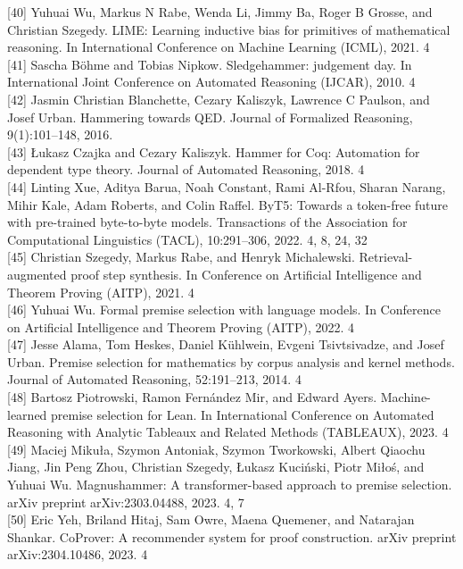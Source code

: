 \documentclass[
]{article}
\begin{document}
{[}40{]} Yuhuai Wu, Markus N Rabe, Wenda Li, Jimmy Ba, Roger B Grosse,
and Christian Szegedy. LIME: Learning inductive bias for primitives of
mathematical reasoning. In International Conference on Machine Learning
(ICML), 2021. 4\\
{[}41{]} Sascha Böhme and Tobias Nipkow. Sledgehammer: judgement day. In
International Joint Conference on Automated Reasoning (IJCAR), 2010. 4\\
{[}42{]} Jasmin Christian Blanchette, Cezary Kaliszyk, Lawrence C
Paulson, and Josef Urban. Hammering towards QED. Journal of Formalized
Reasoning, 9(1):101--148, 2016.\\
{[}43{]} Łukasz Czajka and Cezary Kaliszyk. Hammer for Coq: Automation
for dependent type theory. Journal of Automated Reasoning, 2018. 4\\
{[}44{]} Linting Xue, Aditya Barua, Noah Constant, Rami Al-Rfou, Sharan
Narang, Mihir Kale, Adam Roberts, and Colin Raffel. ByT5: Towards a
token-free future with pre-trained byte-to-byte models. Transactions of
the Association for Computational Linguistics (TACL), 10:291--306, 2022.
4, 8, 24, 32\\
{[}45{]} Christian Szegedy, Markus Rabe, and Henryk Michalewski.
Retrieval-augmented proof step synthesis. In Conference on Artificial
Intelligence and Theorem Proving (AITP), 2021. 4\\
{[}46{]} Yuhuai Wu. Formal premise selection with language models. In
Conference on Artificial Intelligence and Theorem Proving (AITP), 2022.
4\\
{[}47{]} Jesse Alama, Tom Heskes, Daniel Kühlwein, Evgeni Tsivtsivadze,
and Josef Urban. Premise selection for mathematics by corpus analysis
and kernel methods. Journal of Automated Reasoning, 52:191--213, 2014.
4\\
{[}48{]} Bartosz Piotrowski, Ramon Fernández Mir, and Edward Ayers.
Machine-learned premise selection for Lean. In International Conference
on Automated Reasoning with Analytic Tableaux and Related Methods
(TABLEAUX), 2023. 4\\
{[}49{]} Maciej Mikuła, Szymon Antoniak, Szymon Tworkowski, Albert
Qiaochu Jiang, Jin Peng Zhou, Christian Szegedy, Łukasz Kuciński, Piotr
Miłoś, and Yuhuai Wu. Magnushammer: A transformer-based approach to
premise selection. arXiv preprint arXiv:2303.04488, 2023. 4, 7\\
{[}50{]} Eric Yeh, Briland Hitaj, Sam Owre, Maena Quemener, and
Natarajan Shankar. CoProver: A recommender system for proof
construction. arXiv preprint arXiv:2304.10486, 2023. 4\\
\end{document}
